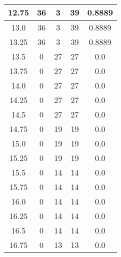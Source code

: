 \documentclass[letterpaper, 12pt]{article}
\begin{document}
\begin{longtable}{|c|c|c|c|c|}
\hline
12.75 & 36 & 3 & 39 & 0.8889 \\
\hline
13.0 & 36 & 3 & 39 & 0.8889 \\
\hline
13.25 & 36 & 3 & 39 & 0.8889 \\
\hline
13.5 & 0 & 27 & 27 & 0.0 \\
\hline
13.75 & 0 & 27 & 27 & 0.0 \\
\hline
14.0 & 0 & 27 & 27 & 0.0 \\
\hline
14.25 & 0 & 27 & 27 & 0.0 \\
\hline
14.5 & 0 & 27 & 27 & 0.0 \\
\hline
14.75 & 0 & 19 & 19 & 0.0 \\
\hline
15.0 & 0 & 19 & 19 & 0.0 \\
\hline
15.25 & 0 & 19 & 19 & 0.0 \\
\hline
15.5 & 0 & 14 & 14 & 0.0 \\
\hline
15.75 & 0 & 14 & 14 & 0.0 \\
\hline
16.0 & 0 & 14 & 14 & 0.0 \\
\hline
16.25 & 0 & 14 & 14 & 0.0 \\
\hline
16.5 & 0 & 14 & 14 & 0.0 \\
\hline
16.75 & 0 & 13 & 13 & 0.0 \\
\hline
\end{longtable}
\end{document}
